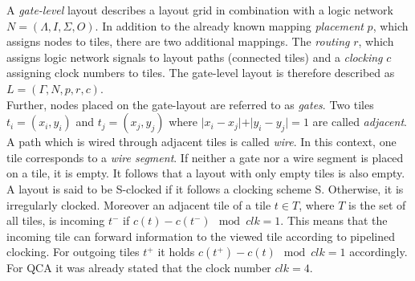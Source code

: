 \begin{definition}
	A \textit{gate-level} layout describes a layout grid in combination with a logic network $N = (\Lambda, I, \Sigma, O)$. In addition to the already known mapping \textit{placement} $p$, which assigns nodes to tiles, there are two additional mappings. The \textit{routing} $r$, which assigns logic network signals to layout paths (connected tiles) and a \textit{clocking} $c$ assigning clock numbers to tiles. The gate-level layout is therefore described as $L = (\Gamma, N, p, r, c)$.\\
	Further, nodes placed on the gate-layout are referred to as \textit{gates}. Two tiles $t_i = (x_i, y_i)$ and $t_j = (x_j, y_j)$ where $\vert x_i-x_j\vert+\vert y_i-y_j\vert = 1$ are called \textit{adjacent}. A path which is wired through adjacent tiles is called \textit{wire}. In this context, one tile corresponds to a \textit{wire segment}. If neither a gate nor a wire segment is placed on a tile, it is empty. It follows that a layout with only empty tiles is also empty. A layout is said to be S-clocked if it follows a clocking scheme S. Otherwise, it is irregularly clocked. Moreover an adjacent tile of a tile $t \in T$, where $T$ is the set of all tiles, is incoming $t^-$ if $c(t) - c(t^-) \mod{clk} = 1$. This means that the incoming tile can forward information to the viewed tile according to pipelined clocking. For outgoing tiles $t^+$ it holds $c(t^+) - c(t) \mod{clk} = 1$ accordingly. For QCA it was already stated that the clock number $clk = 4$.\\
\end{definition}


